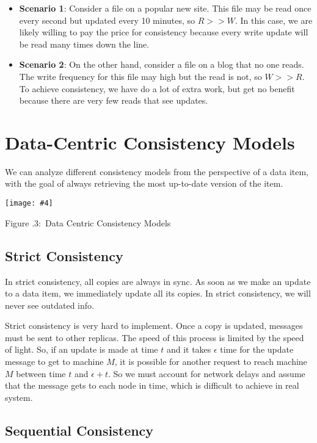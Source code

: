 \documentclass[twoside]{article}
\newcounter{lecnum}
\newcommand{\fig}[4]{
            \centerline{\texttt{[image: \#4]}}
            \begin{center}
            Figure \thelecnum.#1:~#3
            \end{center}
    }
\begin{document}
\begin{itemize}

    \item \textbf{Scenario 1}: Consider a file on a popular new site. This file may be read once every second but updated every 10 minutes, so $R >> W$. In this case, we are likely willing to pay the price for consistency because every write update will be read many times down the line.
    
    \item \textbf{Scenario 2}: On the other hand, consider a file on a blog that no one reads. The write frequency for this file may high but the read is not, so $W >> R$. To achieve consistency, we have do a lot of extra work, but get no benefit because there are very few reads that see updates.
    
\end{itemize}

\section{Data-Centric Consistency Models}

We can analyze different consistency models from the perspective of a data item, with the goal of always retrieving the most up-to-date version of the item.

\fig{3}{0.2}{Data Centric Consistency Models}{datacentric}

\subsection{Strict Consistency}

In strict consistency, all copies are always in sync. As soon as we make an update to a data item, we immediately update all its copies. In strict consistency, we will never see outdated info.

Strict consistency is very hard to implement. Once a copy is updated, messages must be sent to other replicas. The speed of this process is limited by the speed of light. So, if an update is made at time $t$ and it takes $\epsilon$ time for the update message to get to machine $M$, it is possible for another request to reach machine $M$ between time $t$ and $\epsilon + t$. So we must account for network delays and assume that the message gets to each node in time, which is difficult to achieve in real system.

\subsection{Sequential Consistency}
\end{document}
